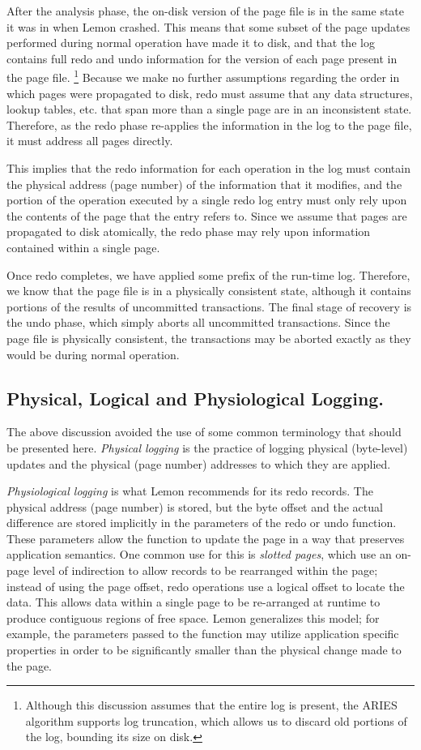 \documentclass[letterpaper,twocolumn,english]{article}
\newcommand{\yad}{Lemon\xspace}
\begin{document}
After the analysis phase, the on-disk version of the page file
is in the same state it was in when \yad crashed. This means that
some subset of the page updates performed during normal operation
have made it to disk, and that the log contains full redo and undo
information for the version of each page present in the page file.%
\footnote{Although this discussion assumes that the entire log is present, the
ARIES algorithm supports log truncation, which allows us to discard
old portions of the log, bounding its size on disk.%
} Because we make no further assumptions regarding the order in which
pages were propagated to disk, redo must assume that any
data structures, lookup tables, etc. that span more than a single
page are in an inconsistent state. Therefore, as the redo phase re-applies
 the information in the log to the page file, it must address all pages directly. 

This implies that the redo information for each operation in the log
must contain the physical address (page number) of the information
that it modifies, and the portion of the operation executed by a single
redo log entry must only rely upon the contents of the page that the 
entry refers to. Since we assume that pages are propagated to disk
atomically, the redo phase may rely upon information contained within
a single page.

Once redo completes, we have applied some prefix of the run-time log.
Therefore, we know that the page file is in
a physically consistent state, although it contains portions of the
results of uncommitted transactions. The final stage of recovery is
the undo phase, which simply aborts all uncommitted transactions. Since
the page file is physically consistent, the transactions may be aborted
exactly as they would be during normal operation. 


\subsection{Physical, Logical and Physiological Logging.}

The above discussion avoided the use of some common terminology 
that should be presented here. {\em Physical logging } 
is the practice of logging physical (byte-level) updates
and the physical (page number) addresses to which they are applied.

{\em Physiological logging } is what \yad recommends for its redo 
records. The physical address (page number) is stored, but the byte offset
and the actual difference are stored implicitly in the parameters
of the redo or undo function. These parameters allow the function to 
update the page in a way that preserves application semantics.
One common use for this is {\em slotted pages}, which use an on-page level of 
indirection to allow records to be rearranged within the page; instead of using the page offset, redo 
operations use a logical offset to locate the data. This allows data within
a single page to be re-arranged at runtime to produce contiguous
regions of free space. \yad generalizes this model; for example, the parameters passed to the function may utilize application specific properties in order to be significantly smaller than the physical change made to the page.~\cite{physiological}
\end{document}
